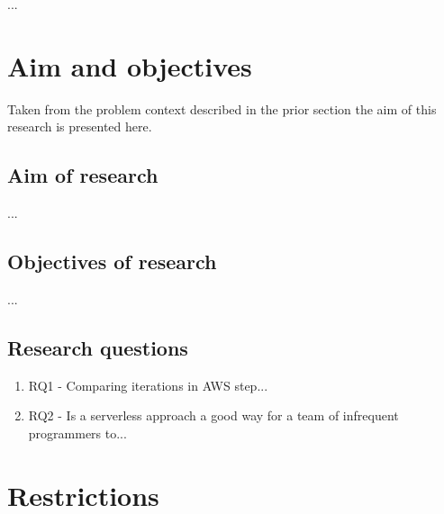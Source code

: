 ...

\section{Aim and objectives}

Taken from the problem context described in the prior section the aim of this research is presented here.



\subsection{Aim of research}

...

\subsection{Objectives of research}

...

\subsection{Research questions}

\begin{enumerate}
\item RQ1 - Comparing iterations in AWS step...
\item RQ2 - Is a serverless approach a good way for a team of infrequent programmers to...
\end{enumerate}

\section{Restrictions}

